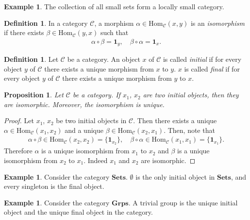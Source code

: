 \documentclass[12pt]{report}
\theoremstyle{plain}
\newtheorem{proposition}[theorem]{Proposition}
\theoremstyle{remark}
\theoremstyle{definition}
\newtheorem{definition}[theorem]{Definition}
\newtheorem{example}[theorem]{Example}
\begin{document}
\begin{example}
    The collection of all small sets form a locally small category.
\end{example}

\begin{definition}
    In a category $\mathcal{C}$, a morphism $\alpha\in\mathrm{Hom}_\mathcal{C}(x,y)$ is an \emph{isomorphism} if there exists $\beta\in\mathrm{Hom}_\mathcal{C}(y,x)$ such that
    \begin{align*}
        \alpha\circ \beta = \mathbf{1}_y,\quad \beta\circ\alpha = \mathbf{1}_x.
    \end{align*}
\end{definition}

\begin{definition}
    Let $\mathcal{C}$ be a category. An object $x$ of $\mathcal{C}$ is called \emph{initial} if for every object $y$ of $\mathcal{C}$ there exists a unique morphism from $x$ to $y$. $x$ is called \emph{final} if for every object $y$ of $\mathcal{C}$ there exists a unique morphism from $y$ to $x$.
\end{definition}

\begin{proposition}
    Let $\mathcal{C}$ be a category. If $x_1$, $x_2$ are two initial objects, then they are isomorphic. Moreover, the isomorphism is unique.
\end{proposition}
\begin{proof}
    Let $x_1$, $x_2$ be two initial objects in $\mathcal{C}$. Then there exists a unique $\alpha\in\mathrm{Hom}_\mathcal{C}(x_1,x_2)$ and a unique $\beta\in\mathrm{Hom}_\mathcal{C}(x_2,x_1)$. Then, note that \begin{align*}
        \alpha\circ \beta \in \mathrm{Hom}_\mathcal{C}(x_2,x_2) = \{\mathbf{1}_{x_2}\},\quad \beta\circ \alpha \in \mathrm{Hom}_\mathcal{C}(x_1,x_1) = \{\mathbf{1}_{x_1}\}.
    \end{align*}
    Therefore $\alpha$ is a unique isomorphism from $x_1$ to $x_2$ and $\beta$ is a unique isomorphism from $x_2$ to $x_1$. Indeed $x_1$ and $x_2$ are isomorphic.
\end{proof}

\begin{example}
    Consider the category $\mathbf{Sets}$. $\emptyset$ is the only initial object in $\mathbf{Sets}$, and every singleton is the final object.
\end{example}

\begin{example}
    Consider the category $\mathbf{Grps}$. A trivial group is the unique initial object and the unique final object in the category.
\end{example}
\end{document}
